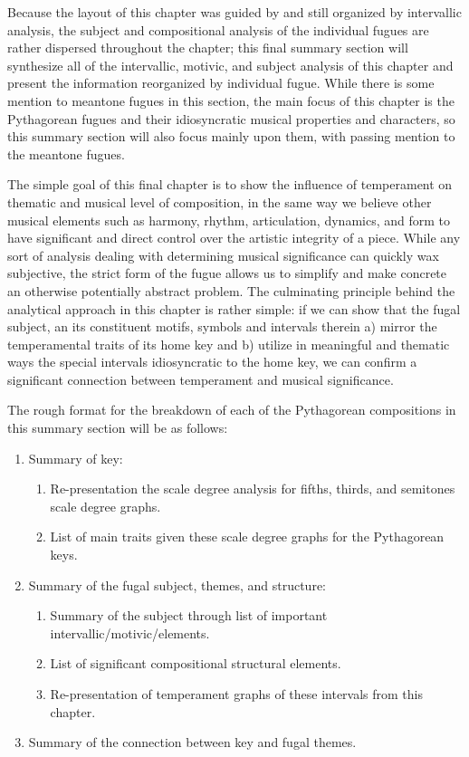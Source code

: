 Because the layout of this chapter was guided by and still organized by
intervallic analysis, the subject and compositional analysis of the
individual fugues are rather dispersed throughout the chapter; this
final summary section will synthesize all of the intervallic, motivic,
and subject analysis of this chapter and present the information
reorganized by individual fugue. While there is some mention to meantone
fugues in this section, the main focus of this chapter is the
Pythagorean fugues and their idiosyncratic musical properties and
characters, so this summary section will also focus mainly upon them,
with passing mention to the meantone fugues.

The simple goal of this final chapter is to show the influence of
temperament on thematic and musical level of composition, in the same
way we believe other musical elements such as harmony, rhythm,
articulation, dynamics, and form to have significant and direct control
over the artistic integrity of a piece. While any sort of analysis
dealing with determining musical significance can quickly wax
subjective, the strict form of the fugue allows us to simplify and make
concrete an otherwise potentially abstract problem. The culminating
principle behind the analytical approach in this chapter is rather
simple: if we can show that the fugal subject, an its constituent
motifs, symbols and intervals therein a) mirror the temperamental traits
of its home key and b) utilize in meaningful and thematic ways the
special intervals idiosyncratic to the home key, we can confirm a
significant connection between temperament and musical significance.

The rough format for the breakdown of each of the Pythagorean
compositions in this summary section will be as follows:

\begin{enumerate}
\def\labelenumi{\arabic{enumi}.}
\tightlist
\item
  Summary of key:

  \begin{enumerate}
  \def\labelenumii{\arabic{enumii}.}
  \tightlist
  \item
    Re-presentation the scale degree analysis for fifths, thirds, and
    semitones scale degree graphs.
  \item
    List of main traits given these scale degree graphs for the
    Pythagorean keys.
  \end{enumerate}
\item
  Summary of the fugal subject, themes, and structure:

  \begin{enumerate}
  \def\labelenumii{\arabic{enumii}.}
  \tightlist
  \item
    Summary of the subject through list of important
    intervallic/motivic/elements.
  \item
    List of significant compositional structural elements.
  \item
    Re-presentation of temperament graphs of these intervals from this
    chapter.
  \end{enumerate}
\item
  Summary of the connection between key and fugal themes.
\end{enumerate}

